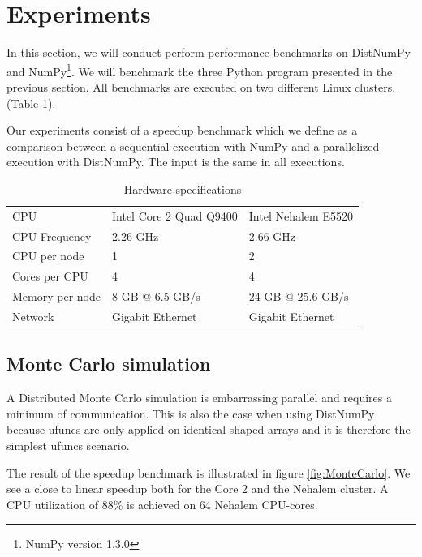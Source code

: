 \documentclass[10pt]{article}
\begin{document}
\section{Experiments}
In this section, we will conduct perform performance benchmarks on DistNumPy and NumPy\footnote{NumPy version 1.3.0}. We will benchmark the three Python program presented in the previous section. All benchmarks are executed on two different Linux clusters. (Table \ref{tab:specs}).

Our experiments consist of a speedup benchmark which we define as a comparison between a sequential execution with NumPy and a parallelized execution with DistNumPy. The input is the same in all executions.


\begin{table}
\caption{Hardware specifications}
\centering
\begin{tabular}{|lll|}
\hline
CPU & Intel Core 2 Quad Q9400 & Intel Nehalem E5520\\
CPU Frequency & 2.26 GHz & 2.66 GHz\\
CPU per node & 1 & 2\\
Cores per CPU & 4 & 4\\
Memory per node & 8 GB @ 6.5 GB/s & 24 GB @ 25.6 GB/s\\
Network & Gigabit Ethernet & Gigabit Ethernet\\
\hline
\end{tabular}

\label{tab:specs}
\end{table}


\subsection{Monte Carlo simulation}
A Distributed Monte Carlo simulation is embarrassing parallel and requires a minimum of communication.  This is also the case when using DistNumPy because ufuncs are only applied on identical shaped arrays and it is therefore the simplest ufuncs scenario.

The result of the speedup benchmark is illustrated in figure \ref{fig:MonteCarlo}. We see a close to linear speedup both for the Core 2 and the Nehalem cluster. A CPU utilization of 88\% is achieved on 64 Nehalem CPU-cores.
\end{document}
